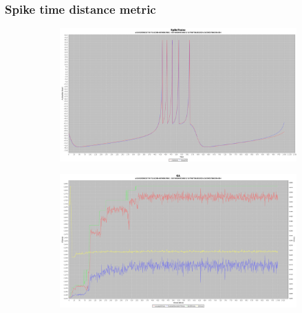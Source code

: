 \documentclass[10pt]{article}
\begin{document}
		\subsubsection{Spike time distance metric}
			\begin{figure}[H]
				\centering
					\begin{subfigure}{.5\textwidth}
						\centering
						\includegraphics[width=\linewidth]{./../images/izzy1/time/plot.png}
						
						\label{fig:sub1a}
					\end{subfigure}%
					\begin{subfigure}{.5\textwidth}
						\centering
						\includegraphics[width=\linewidth]{./../images/izzy1/time/prog.png}
						
						\label{fig:sub1b}
					\end{subfigure}
					
					\label{fig:plot1}
			\end{figure}
			
\end{document}
